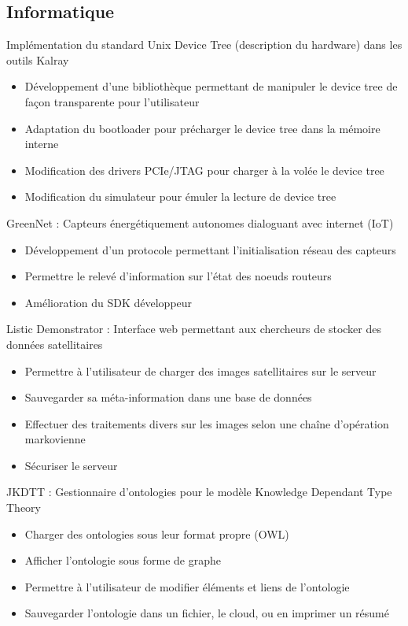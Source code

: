 \documentclass[10pt,a4paper,sans]{moderncv}        %
\begin{document}
\subsection{Informatique}
	{Implémentation du standard Unix Device Tree (description du hardware) dans les outils Kalray
	\begin{itemize}
		\item Développement d'une bibliothèque permettant de manipuler le device
			tree de façon transparente pour l'utilisateur
		\item Adaptation du bootloader pour précharger le device tree dans la
			mémoire interne
		\item Modification des drivers PCIe/JTAG pour charger à la volée le
			device tree
		\item Modification du simulateur pour émuler la lecture de device tree
	\end{itemize}
	}
	{GreenNet : Capteurs énergétiquement autonomes dialoguant avec internet
		(IoT)
	\begin{itemize}
		\item Développement d'un protocole permettant l'initialisation réseau des
			capteurs
		\item Permettre le relevé d'information sur l'état des noeuds routeurs
		\item Amélioration du SDK développeur
	\end{itemize}
	}
	{Listic Demonstrator : Interface web permettant aux chercheurs de stocker des
	données satellitaires
	\begin{itemize}
		\item Permettre à l'utilisateur de charger des images satellitaires sur
			le serveur
		\item Sauvegarder sa méta-information dans une base de données
		\item Effectuer des traitements divers sur les images selon une chaîne
			d'opération markovienne
		\item Sécuriser le serveur
	\end{itemize}
	}
	{JKDTT : Gestionnaire d'ontologies pour le modèle Knowledge Dependant Type
		Theory
	\begin{itemize}
		\item Charger des ontologies sous leur format propre (OWL)
		\item Afficher l'ontologie sous forme de graphe
		\item Permettre à l'utilisateur de modifier éléments et liens de
			l'ontologie
		\item Sauvegarder l'ontologie dans un fichier, le cloud, ou en imprimer
			un résumé
	\end{itemize}
	}
\end{document}
